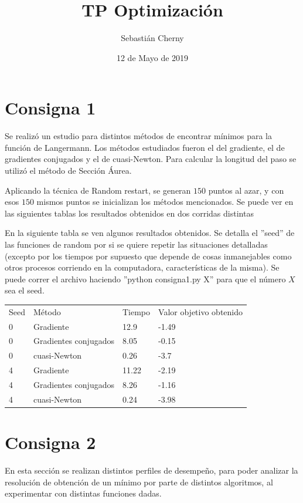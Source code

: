 \documentclass{article}
\title{TP Optimización}
\author{Sebastián Cherny }
\date{12 de Mayo de 2019}
\begin{document}
\maketitle

\section{Consigna 1}
Se realizó un estudio para distintos métodos de encontrar mínimos para la función de Langermann. Los métodos estudiados fueron el del gradiente, el de gradientes conjugados y el de cuasi-Newton. Para calcular la longitud del paso se utilizó el método de Sección Áurea.

Aplicando la técnica de Random restart, se generan $150$ puntos al azar, y con esos $150$ mismos puntos se inicializan los métodos mencionados.
Se puede ver en las siguientes tablas los resultados obtenidos en dos corridas distintas

En la siguiente tabla se ven algunos resultados obtenidos. Se detalla el ''seed'' de las funciones de random por si se quiere repetir las situaciones detalladas (excepto por los tiempos por supuesto que depende de cosas inmanejables como otros procesos corriendo en la computadora, características de la misma). Se puede correr el archivo haciendo ''python consigna1.py X'' para que el número $X$ sea el seed.

\begin{center}
\begin{tabular}{llll}
Seed & Método & Tiempo & Valor objetivo obtenido \\
0 & Gradiente & 12.9 & -1.49 \\
0 & Gradientes conjugados & 8.05 & -0.15 \\
0 & cuasi-Newton & 0.26 & -3.7 \\
4 & Gradiente & 11.22 & -2.19 \\
4 & Gradientes conjugados & 8.26 & -1.16 \\
4 & cuasi-Newton & 0.24 & -3.98 \\
\end{tabular}
\end{center}


\section{Consigna 2}

En esta sección se realizan distintos perfiles de desempeño, para poder analizar la resolución de obtención de un mínimo por parte de distintos algoritmos, al experimentar con distintas funciones dadas.
\end{document}
